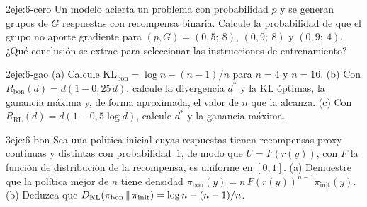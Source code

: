 \begin{ejercicio}{2}{eje:6-cero}
Un modelo acierta un problema con probabilidad $p$ y se generan grupos de $G$ respuestas con recompensa binaria. Calcule la probabilidad de que el grupo no aporte gradiente para $(p,G)=(0{,}5;\ 8)$, $(0{,}9;\ 8)$ y $(0{,}9;\ 4)$. ¿Qué conclusión se extrae para seleccionar las instrucciones de entrenamiento?
\end{ejercicio}

\begin{ejercicio}{2}{eje:6-gao}
(a) Calcule $\mathrm{KL}_{\mathrm{bon}}=\log n-(n-1)/n$ para $n=4$ y $n=16$. (b) Con $R_{\mathrm{bon}}(d)=d(1-0{,}25\,d)$, calcule la divergencia $d^{*}$ y la KL óptimas, la ganancia máxima y, de forma aproximada, el valor de $n$ que la alcanza. (c) Con $R_{\mathrm{RL}}(d)=d(1-0{,}5\log d)$, calcule $d^{*}$ y la ganancia máxima.
\end{ejercicio}

\begin{ejercicio}{3}{eje:6-bon}
Sea una política inicial cuyas respuestas tienen recompensas proxy continuas y distintas con probabilidad~1, de modo que $U=F(r(y))$, con $F$ la función de distribución de la recompensa, es uniforme en $[0,1]$. (a) Demuestre que la política mejor de $n$ tiene densidad $\pi_{\mathrm{bon}}(y)=n\,F(r(y))^{n-1}\pi_{\mathrm{init}}(y)$. (b) Deduzca que $D_{\mathrm{KL}}(\pi_{\mathrm{bon}}\,\|\,\pi_{\mathrm{init}})=\log n-(n-1)/n$.
\end{ejercicio}
